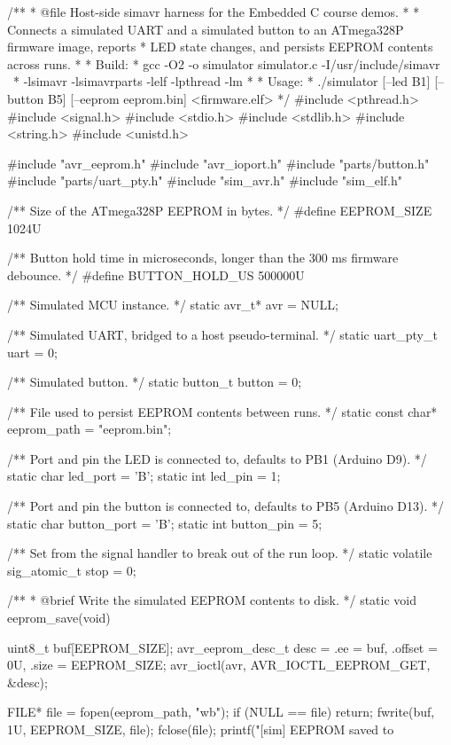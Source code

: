 \begin{ccode}
/**
 * @file Host-side simavr harness for the Embedded C course demos.
 *
 *       Connects a simulated UART and a simulated button to an ATmega328P firmware image, reports
 *       LED state changes, and persists EEPROM contents across runs.
 *
 * Build:
 *   gcc -O2 -o simulator simulator.c -I/usr/include/simavr \
 *       -lsimavr -lsimavrparts -lelf -lpthread -lm
 *
 * Usage:
 *   ./simulator [--led B1] [--button B5] [--eeprom eeprom.bin] <firmware.elf>
 */
#include <pthread.h>
#include <signal.h>
#include <stdio.h>
#include <stdlib.h>
#include <string.h>
#include <unistd.h>

#include "avr_eeprom.h"
#include "avr_ioport.h"
#include "parts/button.h"
#include "parts/uart_pty.h"
#include "sim_avr.h"
#include "sim_elf.h"

/** Size of the ATmega328P EEPROM in bytes. */
#define EEPROM_SIZE 1024U

/** Button hold time in microseconds, longer than the 300 ms firmware debounce. */
#define BUTTON_HOLD_US 500000U

/** Simulated MCU instance. */
static avr_t* avr = NULL;

/** Simulated UART, bridged to a host pseudo-terminal. */
static uart_pty_t uart = {0};

/** Simulated button. */
static button_t button = {0};

/** File used to persist EEPROM contents between runs. */
static const char* eeprom_path = "eeprom.bin";

/** Port and pin the LED is connected to, defaults to PB1 (Arduino D9). */
static char led_port = 'B';
static int led_pin   = 1;

/** Port and pin the button is connected to, defaults to PB5 (Arduino D13). */
static char button_port = 'B';
static int button_pin   = 5;

/** Set from the signal handler to break out of the run loop. */
static volatile sig_atomic_t stop = 0;

/**
 * @brief Write the simulated EEPROM contents to disk.
 */
static void eeprom_save(void)
{
    uint8_t buf[EEPROM_SIZE];
    avr_eeprom_desc_t desc = {.ee = buf, .offset = 0U, .size = EEPROM_SIZE};
    avr_ioctl(avr, AVR_IOCTL_EEPROM_GET, &desc);

    FILE* file = fopen(eeprom_path, "wb");
    if (NULL == file) { return; }
    fwrite(buf, 1U, EEPROM_SIZE, file);
    fclose(file);
    printf("[sim] EEPROM saved to %
}


\end{ccode}
